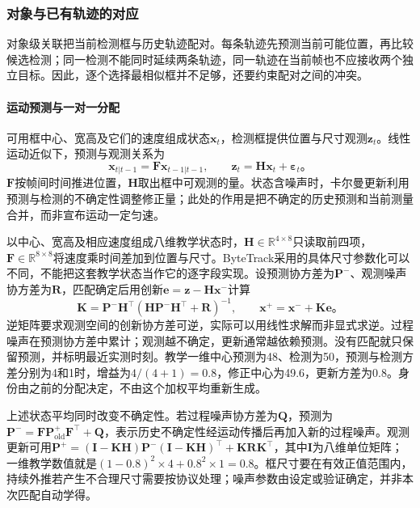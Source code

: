 \subsubsection{对象与已有轨迹的对应}
\label{sec:vision-video-association}

对象级关联把当前检测框与历史轨迹配对。每条轨迹先预测当前可能位置，再比较候选检测；同一检测不能同时延续两条轨迹，同一轨迹在当前帧也不应接收两个独立目标。因此，逐个选择最相似框并不足够，还要约束配对之间的冲突。

\paragraph{运动预测与一对一分配}
\label{sec:vision-video-motion-assignment}

可用框中心、宽高及它们的速度组成状态$\bm{x}_t$，检测框提供位置与尺寸观测$\bm{z}_t$。线性运动近似下，预测与观测关系为
\[
  \bm{x}_{t|t-1}=\bm{F}\bm{x}_{t-1|t-1},
  \qquad
  \bm{z}_t=\bm{H}\bm{x}_t+\bm{\varepsilon}_t\text{。}
\]
$\bm{F}$按帧间时间推进位置，$\bm{H}$取出框中可观测的量。状态含噪声时，卡尔曼更新利用预测与检测的不确定性调整修正量；此处的作用是把不确定的历史预测和当前测量合并，而非宣布运动一定匀速。

以中心、宽高及相应速度组成八维教学状态时，$\bm{H}\in\mathbb{R}^{4\times8}$只读取前四项，$\bm{F}\in\mathbb{R}^{8\times8}$将速度乘时间差加到位置与尺寸。ByteTrack采用的具体尺寸参数化可以不同，不能把这套教学状态当作它的逐字段实现。设预测协方差为$\bm{P}^{-}$、观测噪声协方差为$\bm{R}$，匹配确定后用创新$\bm{e}=\bm{z}-\bm{H}\bm{x}^{-}$计算
\[
  \bm{K}=\bm{P}^{-}\bm{H}^{\top}
  (\bm{H}\bm{P}^{-}\bm{H}^{\top}+\bm{R})^{-1},
  \qquad
  \bm{x}^{+}=\bm{x}^{-}+\bm{K}\bm{e}\text{。}
\]
逆矩阵要求观测空间的创新协方差可逆，实际可以用线性求解而非显式求逆。过程噪声在预测协方差中累计；观测越不确定，更新通常越依赖预测。没有匹配就只保留预测，并标明最近实测时刻。教学一维中心预测为48、检测为50，预测与检测方差分别为4和1时，增益为$4/(4+1)=0.8$，修正中心为49.6，更新方差为0.8。身份由之前的分配决定，不由这个加权平均重新生成。

上述状态平均同时改变不确定性。若过程噪声协方差为$\bm{Q}$，预测为$\bm{P}^{-}=\bm{F}\bm{P}^{+}_{\mathrm{old}}\bm{F}^{\top}+\bm{Q}$，表示历史不确定性经运动传播后再加入新的过程噪声。观测更新可用$\bm{P}^{+}=(\bm{I}-\bm{K}\bm{H})\bm{P}^{-}(\bm{I}-\bm{K}\bm{H})^{\top}+\bm{K}\bm{R}\bm{K}^{\top}$，其中$\bm{I}$为八维单位矩阵；一维教学数值就是$(1-0.8)^2\times4+0.8^2\times1=0.8$。框尺寸要在有效正值范围内，持续外推若产生不合理尺寸需要按协议处理；噪声参数由设定或验证确定，并非本次匹配自动学得。

